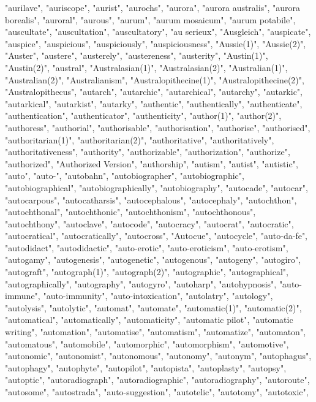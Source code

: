 "aurilave",
"auriscope",
"aurist",
"aurochs",
"aurora",
"aurora australis",
"aurora borealis",
"auroral",
"aurous",
"aurum",
"aurum mosaicum",
"aurum potabile",
"auscultate",
"auscultation",
"auscultatory",
"au serieux",
"Ausgleich",
"auspicate",
"auspice",
"auspicious",
"auspiciously",
"auspiciousness",
"Aussie(1)",
"Aussie(2)",
"Auster",
"austere",
"austerely",
"austereness",
"austerity",
"Austin(1)",
"Austin(2)",
"austral",
"Australasian(1)",
"Australasian(2)",
"Australian(1)",
"Australian(2)",
"Australianism",
"Australopithecine(1)",
"Australopithecine(2)",
"Australopithecus",
"autarch",
"autarchic",
"autarchical",
"autarchy",
"autarkic",
"autarkical",
"autarkist",
"autarky",
"authentic",
"authentically",
"authenticate",
"authentication",
"authenticator",
"authenticity",
"author(1)",
"author(2)",
"authoress",
"authorial",
"authorisable",
"authorisation",
"authorise",
"authorised",
"authoritarian(1)",
"authoritarian(2)",
"authoritative",
"authoritatively",
"authoritativeness",
"authority",
"authorizable",
"authorization",
"authorize",
"authorized",
"Authorized Version",
"authorship",
"autism",
"autist",
"autistic",
"auto",
"auto-",
"autobahn",
"autobiographer",
"autobiographic",
"autobiographical",
"autobiographically",
"autobiography",
"autocade",
"autocar",
"autocarpous",
"autocatharsis",
"autocephalous",
"autocephaly",
"autochthon",
"autochthonal",
"autochthonic",
"autochthonism",
"autochthonous",
"autochthony",
"autoclave",
"autocode",
"autocracy",
"autocrat",
"autocratic",
"autocratical",
"autocratically",
"autocross",
"Autocue",
"autocycle",
"auto-da-fe",
"autodidact",
"autodidactic",
"auto-erotic",
"auto-eroticism",
"auto-erotism",
"autogamy",
"autogenesis",
"autogenetic",
"autogenous",
"autogeny",
"autogiro",
"autograft",
"autograph(1)",
"autograph(2)",
"autographic",
"autographical",
"autographically",
"autography",
"autogyro",
"autoharp",
"autohypnosis",
"auto-immune",
"auto-immunity",
"auto-intoxication",
"autolatry",
"autology",
"autolysis",
"autolytic",
"automat",
"automate",
"automatic(1)",
"automatic(2)",
"automatical",
"automatically",
"automaticity",
"automatic pilot",
"automatic writing",
"automation",
"automatise",
"automatism",
"automatize",
"automaton",
"automatous",
"automobile",
"automorphic",
"automorphism",
"automotive",
"autonomic",
"autonomist",
"autonomous",
"autonomy",
"autonym",
"autophagus",
"autophagy",
"autophyte",
"autopilot",
"autopista",
"autoplasty",
"autopsy",
"autoptic",
"autoradiograph",
"autoradiographic",
"autoradiography",
"autoroute",
"autosome",
"autostrada",
"auto-suggestion",
"autotelic",
"autotomy",
"autotoxic",
